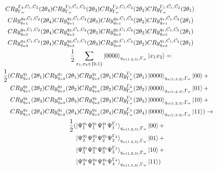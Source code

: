 \documentclass{article}
\begin{document}
\begin{equation}
   \resizebox{.9\hsize}{!}{$\begin{split}
        CRy_{\Gamma_w}^{\Gamma_4,C_1,C_2}(2\theta_4)CRy_{\Gamma_w}^{\Gamma_3,\bar{C_1},C_2}(2\theta_3)CRy_{\Gamma_w}^{\Gamma_2,C_1,\bar{C_2}}(2\theta_2)&CRy_{\Gamma_w}^{\Gamma_1,\bar{C_1},\bar{C_2}}(2\theta_1)\\
        CRy_{q_{w1}}^{q_4,C_1,C_2}(2\theta_4)CRy_{q_{w1}}^{q_3,\bar{C_1},C_2}(2\theta_3)CRy_{q_{w1}}^{q_2,C_1,\bar{C_2}}(2\theta_2)&CRy_{q_{w1}}^{q_1,\bar{C_1},\bar{C_2}}(2\theta_1)\\
        CRy_{q_{w2}}^{q_4,C_1,C_2}(2\theta_4)CRy_{q_{w2}}^{q_3,\bar{C_1},C_2}(2\theta_3)CRy_{q_{w2}}^{q_2,C_1,\bar{C_2}}(2\theta_2)&CRy_{q_{w2}}^{q_1,\bar{C_1},\bar{C_2}}(2\theta_1)\\
        CRy_{q_{w3}}^{q_4,C_1,C_2}(2\theta_4)CRy_{q_{w3}}^{q_3,\bar{C_1},C_2}(2\theta_3)CRy_{q_{w3}}^{q_2,C_1,\bar{C_2}}(2\theta_2)&CRy_{q_{w3}}^{q_1,\bar{C_1},\bar{C_2}}(2\theta_1)\\
        \frac{1}{2}\sum_{x_1,x_2\in\{0,1\}}\ket{0000}_{q_{w(1,2,3)},\Gamma_w}&\ket{ x_1x_2}=\\
        \frac{1}{2}(
        CRy_{q_{w1}}^{q_1}(2\theta_1)CRy_{q_{w2}}^{q_1}(2\theta_1)CRy_{q_{w3}}^{q_1}(2\theta_1) CRy_{\Gamma_w}^{\Gamma_1}(2\theta_1)&\ket{0000}_{q_{w(1,2,3)},\Gamma_w}\ket{ 00}+\\
        CRy_{q_{w1}}^{q_2}(2\theta_2)CRy_{q_{w2}}^{q_2}(2\theta_2)CRy_{q_{w3}}^{q_2}(2\theta_2) CRy_{\Gamma_w}^{\Gamma_2}(2\theta_2)&\ket{0000}_{q_{w(1,2,3)},\Gamma_w}\ket{ 01}+\\
        CRy_{q_{w1}}^{q_3}(2\theta_3)CRy_{q_{w2}}^{q_3}(2\theta_3)CRy_{q_{w3}}^{q_3}(2\theta_3) CRy_{\Gamma_w}^{\Gamma_3}(2\theta_3)&\ket{0000}_{q_{w(1,2,3)},\Gamma_w}\ket{ 10}+\\
        CRy_{q_{w1}}^{q_4}(2\theta_4)CRy_{q_{w2}}^{q_4}(2\theta_4)CRy_{q_{w3}}^{q_4}(2\theta_4) CRy_{\Gamma_w}^{\Gamma_4}(2\theta_4)&\ket{0000}_{q_{w(1,2,3)},\Gamma_w}\ket{ 11})\to\\
        \frac{1}{2}(
        \ket{\Psi^{q_1}_1\Psi^{q_1}_1\Psi^{q_1}_1\Psi^{\Gamma_1}_1}_{q_{w(1,2,3)},\Gamma_w}&\ket{ 00}+\\
        \ket{\Psi^{q_2}_2\Psi^{q_2}_2\Psi^{q_2}_2\Psi^{\Gamma_2}_2}_{q_{w(1,2,3)},\Gamma_w}&\ket{ 01}+\\
        \ket{\Psi^{q_3}_3\Psi^{q_3}_3\Psi^{q_3}_3\Psi^{\Gamma_3}_3}_{q_{w(1,2,3)},\Gamma_w}&\ket{ 10}+\\
        \ket{\Psi^{q_4}_4\Psi^{q_4}_4\Psi^{q_4}_4\Psi^{\Gamma_4}_4}_{q_{w(1,2,3)},\Gamma_w}&\ket{ 11}
        )
   \end{split}$}
\end{equation}
\end{document}
